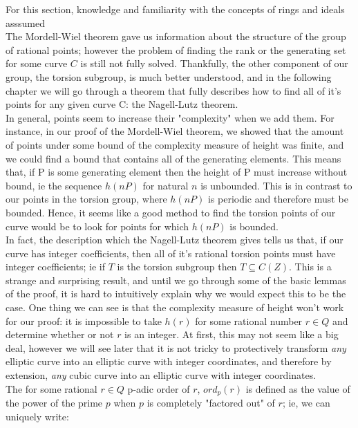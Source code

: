 \documentclass{article}
\begin{document}
For this section, knowledge and familiarity with the concepts of rings and ideals asssumed\\

The Mordell-Wiel theorem gave us information about the structure of the group of rational points; however the problem of finding the rank or the generating set for some curve $C$ is still not fully solved. Thankfully, the other component of our group, the torsion subgroup, is much better understood, and in the following chapter we will go through a theorem that fully describes how to find all of it's points for any given curve C: the Nagell-Lutz theorem.\\

In general, points seem to increase their "complexity" when we add them. For instance, in our proof of the Mordell-Wiel theorem, we showed that the amount of points under some bound of the complexity measure of height was finite, and we could find a bound that contains all of the generating elements. This means that, if P is some generating element then the height of P must increase without bound, ie the sequence $h(nP)$ for natural $n$ is unbounded. This is in contrast to our points in the torsion group, where $h(nP)$ is periodic and therefore must be bounded. Hence, it seems like a good method to find the torsion points of our curve would be to look for points for which $h(nP)$ is bounded.\\

In fact, the description which the Nagell-Lutz theorem gives tells us that, if our curve has integer coefficients, then all of it's rational torsion points must have integer coefficients; ie if $T$ is the torsion subgroup then $T \subseteq C(Z)$. This is a strange and surprising result, and until we go through some of the basic lemmas of the proof, it is hard to intuitively explain why we would expect this to be the case. One thing we can see is that the complexity measure of height won't work for our proof: it is impossible to take $h(r)$ for some rational number $r \in Q$ and determine whether or not $r$ is an integer. At first, this may not seem like a big deal, however we will see later that it is not tricky to protectively transform \emph{any} elliptic curve into an elliptic curve with integer coordinates, and therefore by extension, \emph{any} cubic curve into an elliptic curve with integer coordinates.\\

The for some rational $r \in Q$ p-adic order of $r$, $ord_p(r)$ is defined as the value of the power of the prime $p$ when $p$ is completely "factored out" of $r$; ie, we can uniquely write:\\
\end{document}
